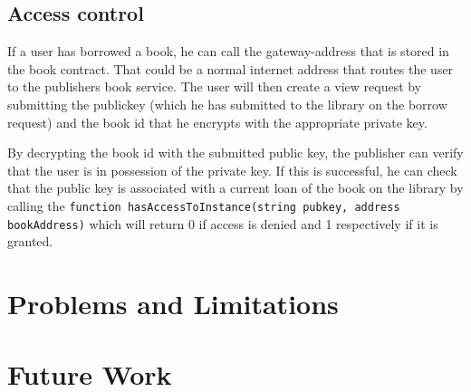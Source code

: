 \subsection{Access control}
If a user has borrowed a book, he can call the gateway-address that is stored in the book contract. That could be a normal internet address that routes the user to the publishers book service.
The user will then create a view request by submitting the publickey (which he has submitted to the library on the borrow request) and the book id that he encrypts with the appropriate private key.

By decrypting the book id with the submitted public key, the publisher can verify that the user is in possession of the private key. If this is successful, he can check that the public key is associated with a current loan of the book on the library by calling the \verb|function hasAccessToInstance(string pubkey, address bookAddress)| which will return 0 if access is denied and 1 respectively if it is granted. 

\section{Problems and Limitations}

\section{Future Work}
